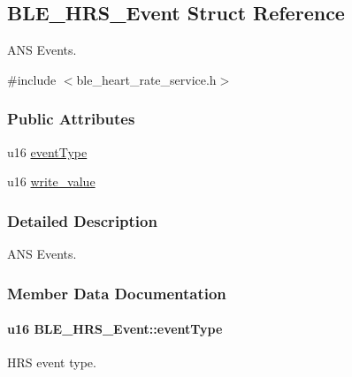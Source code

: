 \hypertarget{struct_b_l_e___h_r_s___event}{}\subsection{B\+L\+E\+\_\+\+H\+R\+S\+\_\+\+Event Struct Reference}
\label{struct_b_l_e___h_r_s___event}


A\+NS Events.  




{\ttfamily \#include $<$ble\+\_\+heart\+\_\+rate\+\_\+service.\+h$>$}

\subsubsection*{Public Attributes}
\begin{DoxyCompactItemize}
\item 
u16 \hyperlink{struct_b_l_e___h_r_s___event_a94eeec01e084a4dffe2cfce9a4e456ab}{event\+Type}
\item 
u16 \hyperlink{struct_b_l_e___h_r_s___event_ac02debd342b4423ac228f32d66a91f3a}{write\+\_\+value}
\end{DoxyCompactItemize}


\subsubsection{Detailed Description}
A\+NS Events. 

\subsubsection{Member Data Documentation}
\paragraph[{\texorpdfstring{event\+Type}{eventType}}]{\setlength{\rightskip}{0pt plus 5cm}u16 B\+L\+E\+\_\+\+H\+R\+S\+\_\+\+Event\+::event\+Type}\hypertarget{struct_b_l_e___h_r_s___event_a94eeec01e084a4dffe2cfce9a4e456ab}{}\label{struct_b_l_e___h_r_s___event_a94eeec01e084a4dffe2cfce9a4e456ab}
H\+RS event type. 
